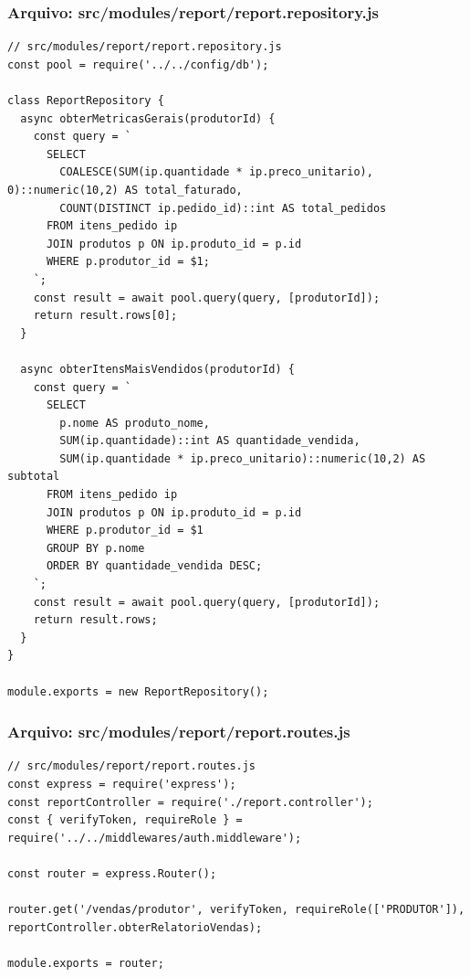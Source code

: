 \subsubsection*{Arquivo: src/modules/report/report.repository.js}
\begin{lstlisting}[caption={src/modules/report/report.repository.js}]
// src/modules/report/report.repository.js
const pool = require('../../config/db');

class ReportRepository {
  async obterMetricasGerais(produtorId) {
    const query = `
      SELECT 
        COALESCE(SUM(ip.quantidade * ip.preco_unitario), 0)::numeric(10,2) AS total_faturado,
        COUNT(DISTINCT ip.pedido_id)::int AS total_pedidos
      FROM itens_pedido ip
      JOIN produtos p ON ip.produto_id = p.id
      WHERE p.produtor_id = $1;
    `;
    const result = await pool.query(query, [produtorId]);
    return result.rows[0];
  }

  async obterItensMaisVendidos(produtorId) {
    const query = `
      SELECT 
        p.nome AS produto_nome,
        SUM(ip.quantidade)::int AS quantidade_vendida,
        SUM(ip.quantidade * ip.preco_unitario)::numeric(10,2) AS subtotal
      FROM itens_pedido ip
      JOIN produtos p ON ip.produto_id = p.id
      WHERE p.produtor_id = $1
      GROUP BY p.nome
      ORDER BY quantidade_vendida DESC;
    `;
    const result = await pool.query(query, [produtorId]);
    return result.rows;
  }
}

module.exports = new ReportRepository();\end{lstlisting}
\vspace{0.5cm}
\subsubsection*{Arquivo: src/modules/report/report.routes.js}
\begin{lstlisting}[caption={src/modules/report/report.routes.js}]
// src/modules/report/report.routes.js
const express = require('express');
const reportController = require('./report.controller');
const { verifyToken, requireRole } = require('../../middlewares/auth.middleware');

const router = express.Router();

router.get('/vendas/produtor', verifyToken, requireRole(['PRODUTOR']), reportController.obterRelatorioVendas);

module.exports = router;\end{lstlisting}
\vspace{0.5cm}
